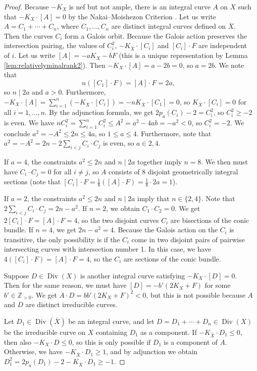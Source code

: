 \documentclass[a4paper, 11pt, reqno]{amsart}
\numberwithin{equation}{section} \numberwithin{figure}{section}
\DeclareMathOperator{\Div}{Div}
\def \Z {{\mathbb Z}}
\theoremstyle{definition}
\numberwithin{lemma}{section}
\begin{document}
\begin{proof}
    Because $-K_X$ is nef but not ample, there is an integral curve $A$ on $X$ such that $-K_X \cdot [A] = 0$ by the Nakai--Moishezon Criterion \cite[V, Theorem 1.10]{hartshorne}. Let us write $A = C_1 + \cdots + C_n$, where $C_1, \ldots, C_n$ are distinct integral curves defined on $\overline{X}$. Then the curves $C_i$ form a Galois orbit. Because the Galois action preserves the intersection pairing, the values of $C_i^2$, $-K_{\overline{X}} \cdot [C_i]$ and $[C_i] \cdot F$ are independent of $i$. Let us write $[A] = -aK_X - bF$ (this is a unique representation by Lemma \ref{lem:relativelyminalrank2}). Then $-K_X \cdot [A] = a -2b = 0$, so $a = 2b$. We note that \[n ([C_1] \cdot F) = [A] \cdot F = 2a,\] so $n \mid 2a$ and $a > 0$. Furthermore, $-K_X \cdot [A] = \sum_{i=1}^n (-K_{\overline{X}} \cdot [C_i]) = - n K_{\overline{X}} \cdot [C_1] = 0$, so $K_{\overline{X}} \cdot [C_i] = 0$ for all $i = 1, \ldots, n$. By the adjunction formula, we get $2 p_a(C_i) - 2 = C_i^2$, so $C_i^2 \geq -2$ is even. We have $n C_i^2 = \sum_{i=1}^n C_i^2 \leq A^2 = a^2 - 4ab = -a^2 < 0$, so $C_i^2 = -2$. We conclude $a^2 = -A^2 \leq 2n \leq 4a$, so $1 \leq a \leq 4$. Furthermore, note that $a^2 = -A^2 = 2n - 2\sum_{i < j} C_i \cdot C_j$ is even, so $a \in 2, 4$.

    If $a = 4$, the constraints $a^2 \leq 2n$ and $n \mid 2a$ together imply $n = 8$. We then must have $C_i \cdot C_j = 0$ for all $i \neq j$, so $A$ consists of $8$ disjoint geometrically integral sections (note that $[C_i] \cdot F = \frac{1}{8} ([A] \cdot F) = \frac{1}{8} \cdot 2a = 1$).

    If $a = 2$, the constraints $a^2 \leq 2n$ and $n \mid 2a$ imply that $n \in \{2, 4\}$. Note that $2\sum_{i<j} C_i\cdot C_j = 2n - a^2$. If $n = 2$, we obtain $C_1 \cdot C_2 = 0$. We get $2 [C_i] \cdot F = [A] \cdot F = 4$, so the two disjoint curves $C_i$ are bisections of the conic bundle. If $n = 4$, we get $2n -a^2 = 4$. Because the Galois action on the $C_i$ is transitive, the only possibility is if the $C_i$ come in two disjoint pairs of pairwise intersecting curves with intersection number 1. In this case, we have $4 ([C_i] \cdot F) = [A] \cdot F = 4$, so the $C_i$ are sections of the conic bundle. 

    Suppose $D \in \Div(X)$ is another integral curve satisfying $-K_X \cdot [D] = 0$. Then for the same reason, we must have $[D] = -b'(2K_X + F)$ for some $b' \in \Z_{>0}$. We get $A \cdot D = b b' (2K_X + F)^2 < 0$, but this is not possible because $A$ and $D$ are distinct irreducible curves.

    Let $D_1 \in \Div(\overline{X})$ be an integral curve, and let $D = D_1 + \cdots + D_n \in \Div(X)$ be the irreducible curve on $X$ containing $D_1$ as a component. If $-K_{\overline{X}} \cdot D_1 \leq 0$, then also $-K_X \cdot D \leq 0$, so this is only possible if $D_1$ is a component of $A$. Otherwise, we have $-K_{\overline{X}} \cdot D_1 \geq 1$, and by adjunction we obtain $D_1^2 = 2p_a(D_1) - 2 - K_{\overline{X}} \cdot D_1 \geq -1$.
\end{proof}
\end{document}
